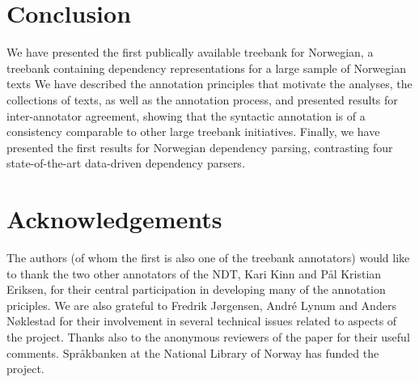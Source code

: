 \documentclass[10pt,a4paper]{article}
\begin{document}
\section{Conclusion}
We have presented the first publically available treebank for Norwegian, a treebank
containing dependency representations for a large sample of Norwegian
texts
We have described the
annotation principles that motivate the analyses, the collections of
texts, as well as the annotation process, and presented results for
inter-annotator agreement, showing that the syntactic annotation is of
a consistency comparable to other large treebank initiatives. Finally,
we have presented the first results for Norwegian dependency parsing,
contrasting four state-of-the-art data-driven dependency parsers.

\section{Acknowledgements}

The authors (of whom the first is also one of the treebank annotators) would like to thank the two other annotators of the NDT, Kari Kinn and Pål Kristian Eriksen, for their central participation in developing many of the annotation priciples. We are also grateful to Fredrik Jørgensen, André Lynum and Anders Nøklestad for their involvement in several technical issues related to aspects of the project. Thanks also to the anonymous reviewers of the paper for their useful comments. Spr{\aa}kbanken at the National Library of Norway has funded the project.





\end{document}
